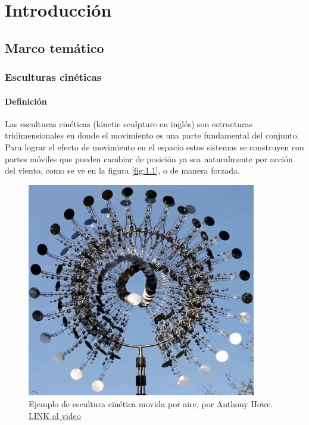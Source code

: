 \chapter{Introducción}
\thispagestyle{empty}


\section{Marco temático}
\subsection{Esculturas cinéticas}
\subsubsection{Definición}
Las esculturas cinéticas (kinetic sculpture en inglés) son estructuras tridimensionales en donde el movimiento es una parte fundamental del conjunto. Para lograr el efecto de movimiento en el espacio estos sistemas se construyen con partes móviles que pueden cambiar de posición ya sea naturalmente por acción del viento, como se ve en la figura \ref{fig:1.1}, o de manera forzada. \\

\begin{figure}[!ht]
	\centering
	\includegraphics[width=10cm,scale=1]{resources/1_1-kinSculp.png}
	\caption{ Ejemplo de escultura cinética movida por aire, por Anthony Howe. \href{https://www.youtube.com/watch?v=N-1LpikCSR4}{LINK al video} }
	\label{fig:\thefigure}
\end{figure}


